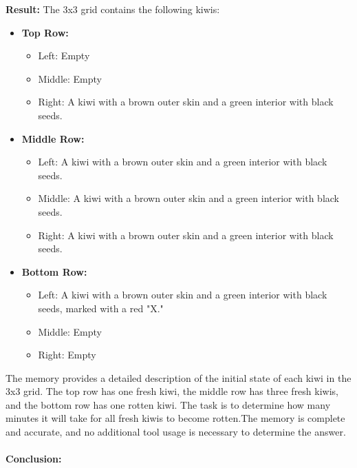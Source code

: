 \begin{executorbox}
\textbf{Result:}
The 3x3 grid contains the following kiwis:

\begin{itemize}
    \item \textbf{Top Row:}
    \begin{itemize}
        \item Left: Empty
        \item Middle: Empty
        \item Right: A kiwi with a brown outer skin and a green interior with black seeds.
    \end{itemize}

    \item \textbf{Middle Row:}
    \begin{itemize}
        \item Left: A kiwi with a brown outer skin and a green interior with black seeds.
        \item Middle: A kiwi with a brown outer skin and a green interior with black seeds.
        \item Right: A kiwi with a brown outer skin and a green interior with black seeds.
    \end{itemize}

    \item \textbf{Bottom Row:}
    \begin{itemize}
        \item Left: A kiwi with a brown outer skin and a green interior with black seeds, marked with a red "X."
        \item Middle: Empty
        \item Right: Empty
    \end{itemize}
\end{itemize}


\end{executorbox}


\begin{plannerbox}
The memory provides a detailed description of the initial state of each kiwi in the 3x3 grid. The top row has one fresh kiwi, the middle row has three fresh kiwis, and the bottom row has one rotten kiwi. The task is to determine how many minutes it will take for all fresh kiwis to become rotten.The memory is complete and accurate, and no additional tool usage is necessary to determine the answer.
\\\\
\textbf{Conclusion:} 
\end{plannerbox}

